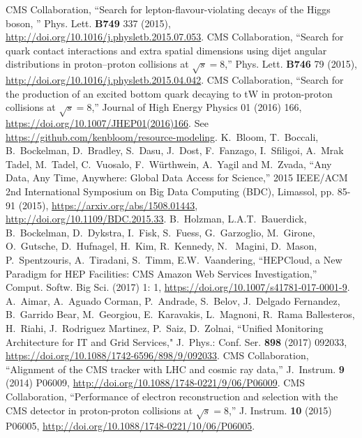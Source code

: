 \begin{thebibliography}{99}
%
%
%
 CMS Collaboration, ``Search for lepton-flavour-violating decays of the Higgs boson, '' Phys. Lett. {\bf B749} 337 (2015), \url{http://doi.org/10.1016/j.physletb.2015.07.053}.
%
CMS Collaboration, ``Search for quark contact interactions and extra spatial dimensions using dijet angular distributions in proton–proton collisions at $\sqrt{s}=8$\TeV,'' Phys. Lett. {\bf B746} 79 (2015), \url{http://doi.org/10.1016/j.physletb.2015.04.042}.
%
CMS Collaboration, ``Search for the production of an excited bottom quark decaying to tW in proton-proton collisions at $\sqrt{s} = 8$\TeV,'' Journal of High Energy Physics 01 (2016) 166,  \url{https://doi.org/10.1007/JHEP01(2016)166}.
%
%
  See
  \url{https://github.com/kenbloom/resource-modeling}.
 K.~Bloom, T.~Boccali, B.~Bockelman, D.~Bradley, S.~Dasu,
  J.~Dost, F.~Fanzago, I.~Sfiligoi, A.~Mrak Tadel, M.~Tadel, C.~Vuosalo,
  F.~W{\"u}rthwein, A.~Yagil and M.~Zvada, ``Any Data, Any Time, Anywhere:
  Global Data Access for Science,'' 2015 IEEE/ACM 2nd International
  Symposium on Big Data Computing (BDC), Limassol, pp. 85-91 (2015),
  \url{https://arxiv.org/abs/1508.01443}, \url{http://doi.org/10.1109/BDC.2015.33}.
%
 B.~Holzman, L.A.T.~Bauerdick, B.~Bockelman, D.~Dykstra, I.~Fisk, S.~Fuess, G.~Garzoglio, M.~Girone, O.~Gutsche, D.~Hufnagel, H.~Kim, R.~Kennedy, N.~ Magini, D.~Mason, P.~Spentzouris, A.~Tiradani, S.~Timm, E.W.~Vaandering, ``HEPCloud, a New Paradigm for HEP Facilities: CMS Amazon Web Services Investigation,''
Comput. Softw. Big Sci. (2017) 1: 1, \url{https://doi.org/10.1007/s41781-017-0001-9}.
%
 A.~Aimar, A.~Aguado Corman, P.~Andrade, S.~Belov, J.~Delgado Fernandez, B.~Garrido Bear, M.~Georgiou, E.~Karavakis, L.~Magnoni, R.~Rama Ballesteros, H.~Riahi, J.~Rodriguez Martinez, P.~Saiz, D.~Zolnai, ``Unified Monitoring Architecture for IT and Grid Services," J.~Phys.: Conf. Ser. {\bf 898} (2017) 092033, \url{https://doi.org/10.1088/1742-6596/898/9/092033}.
%
%
CMS Collaboration, ``Alignment of the CMS tracker with LHC and cosmic ray data,'' J.~Instrum. \textbf{9} (2014) P06009, 
\url{http://doi.org/10.1088/1748-0221/9/06/P06009}.
%
CMS Collaboration, ``Performance of electron reconstruction and selection with the CMS detector in proton-proton collisions at $\sqrt{s}=8$\TeV,'' J. Instrum. {\bf 10} (2015) P06005, \url{http://doi.org/10.1088/1748-0221/10/06/P06005}.

\end{thebibliography}
